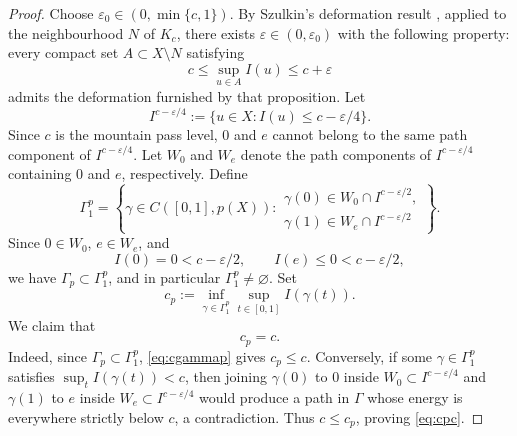 \documentclass[11pt,reqno]{amsart}
\theoremstyle{plain}
\theoremstyle{definition}
\numberwithin{equation}{section}
\begin{document}
\begin{proof}
Choose $\varepsilon_0\in(0,\min\{c,1\})$. By Szulkin's deformation result
\cite[Proposition 2.3]{Sz86}, applied to the neighbourhood $N$ of
$K_c$, there exists $\varepsilon\in(0,\varepsilon_0)$ with the
following property: every compact set $A\subset X\setminus N$ satisfying
$$
c\leq \sup_{u\in A}I(u)\leq c+\varepsilon
$$
admits the deformation furnished by that proposition. Let
$$
I^{c-\varepsilon/4}:=
\{u\in X:I(u)\leq c-\varepsilon/4\}.
$$
Since $c$ is the mountain pass level, $0$ and $e$ cannot belong to the
same path component of $I^{c-\varepsilon/4}$. Let $W_0$ and $W_e$
denote the path components of $I^{c-\varepsilon/4}$ containing $0$
and $e$, respectively. Define
$$
\Gamma_1^p
=
\left\{
\gamma\in C([0,1],p(X)):
\begin{array}{l}
\gamma(0)\in W_0\cap I^{c-\varepsilon/2},\\
\gamma(1)\in W_e\cap I^{c-\varepsilon/2}
\end{array}
\right\}.
$$
Since $0\in W_0$, $e\in W_e$, and
$$
I(0)=0<c-\varepsilon/2,
\qquad
I(e)\leq0<c-\varepsilon/2,
$$
we have $\Gamma_p\subset\Gamma_1^p$, and in particular
$\Gamma_1^p\neq\varnothing$. Set
$$
c_p:=
\inf_{\gamma\in\Gamma_1^p}
\sup_{t\in[0,1]}I(\gamma(t)).
$$
We claim that
\begin{equation}\label{eq:cpc}
c_p=c.
\end{equation}
Indeed, since $\Gamma_p\subset\Gamma_1^p$, \eqref{eq:cgammap} gives
$c_p\leq c$. Conversely, if some $\gamma\in\Gamma_1^p$ satisfies
$\sup_t I(\gamma(t))<c$, then joining $\gamma(0)$ to $0$ inside
$W_0\subset I^{c-\varepsilon/4}$ and $\gamma(1)$ to $e$ inside
$W_e\subset I^{c-\varepsilon/4}$ would produce a path in $\Gamma$
whose energy is everywhere strictly below $c$, a contradiction.
Thus $c\leq c_p$, proving \eqref{eq:cpc}.


\end{proof}
\end{document}
